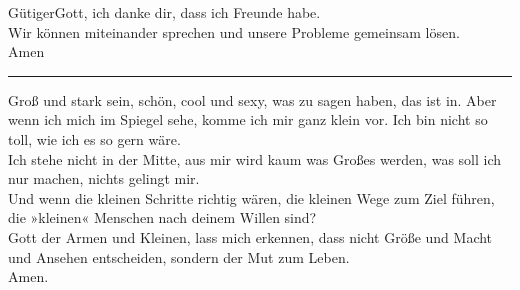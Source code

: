 GütigerGott, ich danke dir, dass ich Freunde habe.\\ 
Wir können miteinander sprechen und unsere Probleme gemeinsam lösen.\\ \newline
Amen\\
\par\noindent\rule{\textwidth}{0.4pt} \newline \newline
Groß und stark sein, schön, cool und sexy, was zu sagen haben, das ist in. Aber wenn ich mich im Spiegel sehe, komme ich mir ganz klein vor. Ich bin nicht so toll, wie ich es so gern wäre.\\ \newline 
Ich stehe nicht in der Mitte, aus mir wird kaum was Großes werden, was soll ich nur machen, nichts gelingt mir. \\ \newline
Und wenn die kleinen Schritte richtig wären, die kleinen Wege zum Ziel führen, die »kleinen« Menschen nach deinem Willen sind? \\ \newline
Gott der Armen und Kleinen, lass mich erkennen, dass nicht Größe und Macht und Ansehen entscheiden, sondern der Mut zum Leben.\\ \newline
Amen.\\

